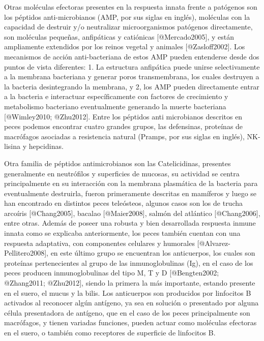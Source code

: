 Otras moléculas efectoras presentes en la respuesta innata frente a patógenos son los péptidos anti-microbianos (AMP, por sus siglas en inglés), moléculas con la capacidad de destruir y/o neutralizar microorganismos patógenos directamente, son moléculas pequeñas, anfipáticas y catiónicas [@Mercado2005]⁠, y están ampliamente extendidos por los reinos vegetal y animales [@Zasloff2002]. Los mecanismos de acción anti-bacteriana de estos AMP pueden entenderse desde dos puntos de vista diferentes: 1. La estructura anfipática puede unirse selectivamente a la membrana bacteriana y generar poros transmembrana, los cuales destruyen a la bacteria desintegrando la membrana, y 2, los AMP pueden directamente entrar a la bacteria e interactuar específicamente con factores de crecimiento y metabolismo bacteriano eventualmente generando la muerte bacteriana [@Wimley2010; @Zhu2012]⁠. Entre los péptidos anti microbianos descritos en peces podemos encontrar cuatro grandes grupos, las defensinas, proteínas de macrófagos asociadas a resistencia natural (Pramps, por sus siglas en inglés), NK-lisina y hepcidinas. 

Otra familia de péptidos antimicrobianos son las Catelicidinas, presentes generalmente en neutrófilos y superficies de mucosas, su actividad se centra principalmente en su interacción con la membrana plasmática de la bacteria para eventualmente destruirla, fueron primeramente descritas en mamíferos y luego se han encontrado en distintos peces teleósteos, algunos casos son los de trucha arcoíris [@Chang2005]⁠, bacalao [@Maier2008], salmón del atlántico [@Chang2006], entre otras.
Además de poseer una robusta y bien desarrollada respuesta inmune innata como se explicaba anteriormente, los peces también cuentan con una respuesta adaptativa, con componentes celulares y humorales [@Alvarez-Pellitero2008]⁠, en este último grupo se encuentran los anticuerpos, los cuales son proteínas pertenecientes al grupo de las inmunoglobulinas (Ig), en el caso de los peces producen inmunoglobulinas del tipo M, T y D [@Bengten2002; @Zhang2011; @Zhu2012]⁠, siendo la primera la más importante, estando presente en el suero, el mucus y la bilis. Los anticuerpos son producidos por linfocitos B activados al reconocer algún antígeno, ya sea en solución o presentado por alguna célula presentadora de antígeno, que en el caso de los peces principalmente son macrófagos, y tienen variadas funciones, pueden actuar como moléculas efectoras en el suero, o también como receptores de superficie de linfocitos B.

